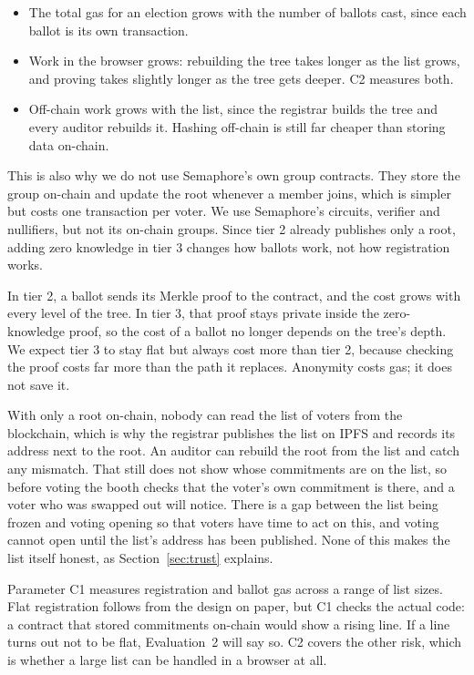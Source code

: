 \begin{itemize}
  \item The total gas for an election grows with the number of ballots cast,
        since each ballot is its own transaction.
  \item Work in the browser grows: rebuilding the tree takes longer as the list
        grows, and proving takes slightly longer as the tree gets deeper. C2
        measures both.
  \item Off-chain work grows with the list, since the registrar builds the tree
        and every auditor rebuilds it. Hashing off-chain is still far cheaper
        than storing data on-chain.
\end{itemize}

This is also why we do not use Semaphore's own group contracts. They store the
group on-chain and update the root whenever a member joins, which is simpler
but costs one transaction per voter. We use Semaphore's circuits, verifier and
nullifiers, but not its on-chain groups. Since tier 2 already publishes only a
root, adding zero knowledge in tier 3 changes how ballots work, not how
registration works.

In tier 2, a ballot sends its Merkle proof to the contract, and the cost grows
with every level of the tree. In tier 3, that proof stays private inside the
zero-knowledge proof, so the cost of a ballot no longer depends on the tree's
depth. We expect tier 3 to stay flat but always cost more than tier 2, because
checking the proof costs far more than the path it replaces. Anonymity costs
gas; it does not save it.

With only a root on-chain, nobody can read the list of voters from the
blockchain, which is why the registrar publishes the list on IPFS and records
its address next to the root. An auditor can rebuild the root from the list and
catch any mismatch. That still does not show whose commitments are on the list,
so before voting the booth checks that the voter's own commitment is there, and
a voter who was swapped out will notice. There is a gap between the list being
frozen and voting opening so that voters have time to act on this, and voting
cannot open until the list's address has been published. None of this makes
the list itself honest, as Section~\ref{sec:trust} explains.

Parameter C1 measures registration and ballot gas across a range of list
sizes. Flat registration follows from the design on paper, but C1 checks the
actual code: a contract that stored commitments on-chain would show a rising
line. If a line turns out not to be flat, Evaluation~2 will say so. C2 covers
the other risk, which is whether a large list can be handled in a browser at
all.

